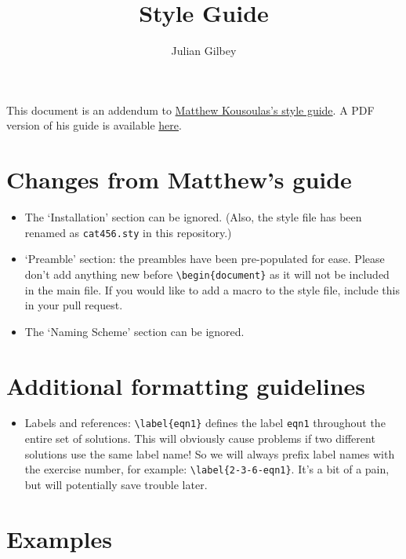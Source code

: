 \documentclass{article}
\title{Style Guide}
\author{Julian Gilbey}
\begin{document}
\maketitle

This document is an addendum to
\href{https://github.com/madkous/math490/blob/master/style-guide/style-guide.tex}{Matthew
  Kousoulas's style guide}.  A PDF version of his guide is available
\href{https://github.com/juliangilbey/math490/blob/minor-latex-fixes/style-guide/style-guide.pdf}{here}.

\section*{Changes from Matthew's guide}

\begin{itemize}
\item The `Installation' section can be ignored.  (Also, the style
  file has been renamed as \verb+cat456.sty+ in this repository.)
\item `Preamble' section: the preambles have been pre-populated for
  ease.  Please don't add anything new before \verb+\begin{document}+
  as it will not be included in the main file.  If you would like to
  add a macro to the style file, include this in your pull request.
\item The `Naming Scheme' section can be ignored.
\end{itemize}

\section*{Additional formatting guidelines}

\begin{itemize}
\item Labels and references: \verb+\label{eqn1}+ defines the label
  \verb+eqn1+ throughout the entire set of solutions.  This will
  obviously cause problems if two different solutions use the same
  label name!  So we will always prefix label names with the exercise
  number, for example: \verb+\label{2-3-6-eqn1}+.  It's a bit of a
  pain, but will potentially save trouble later.
\end{itemize}

\section*{Examples}
\end{document}
